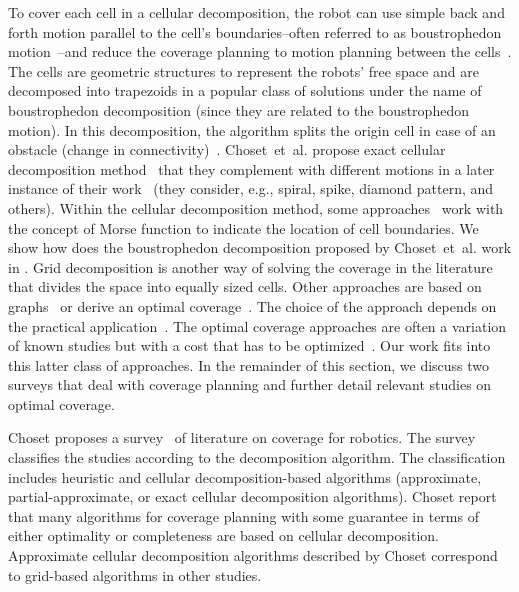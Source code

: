 To cover each cell in a cellular decomposition, the robot can use simple back and forth motion parallel to the cell's boundaries--often referred to as boustrophedon motion~\citep{lavalle2006planning}--and reduce the coverage planning to motion planning between the cells~\citep{choset2001coverage}. The cells are geometric structures to represent the robots' free space and are decomposed into trapezoids in a popular class of solutions under the name of boustrophedon decomposition (since they are related to the boustrophedon motion). In this decomposition, the algorithm splits the origin cell in case of an obstacle (change in connectivity)~\citep{choset2000exact}. Choset~et~al. propose exact cellular decomposition method~\citep{choset1998coverage} that they complement with different motions in a later instance of their work~\citep{choset2000exact} (they consider, e.g., spiral, spike, diamond pattern, and others). Within the cellular decomposition method, some approaches~\citep{choset2000exact,acar2002morse} work with the concept of Morse function to indicate the location of cell boundaries. We show how does the boustrophedon decomposition proposed by Choset~et~al. work in . Grid decomposition is another way of solving the coverage in the literature~\citep{zelinsky1993planning,gabriely2002spiral,shnaps2016online,wei2018coverage} that divides the space into equally sized cells. Other approaches are based on graphs~\citep{cheng2019graph} or derive an optimal coverage~\citep{huang2001optimal,xu2011optimal,lee2011smooth,li2011coverage,wei2018coverage}. The choice of the approach depends on the practical application~\citep{wei2018coverage}. The optimal coverage approaches are often a variation of known studies but with a cost that has to be optimized~\citep{galceran2013survey}. Our work fits into this latter class of approaches. In the remainder of this section, we discuss two surveys that deal with coverage planning and further detail relevant studies on optimal coverage. 

Choset proposes a survey~\citep{choset2001coverage} of literature on coverage for robotics. The survey classifies the studies according to the decomposition algorithm. The classification includes heuristic and cellular decomposition-based algorithms (approximate, partial-approximate, or exact cellular decomposition algorithms). Choset report that many algorithms for coverage planning with some guarantee in terms of either optimality or completeness are based on cellular decomposition. Approximate cellular decomposition algorithms described by Choset correspond to grid-based algorithms in other studies.

